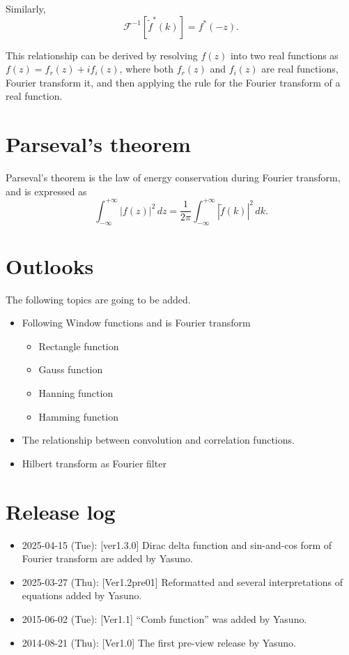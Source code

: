 \documentclass[a4paper]{article}
\newcommand{\intinfty}{\int^{+\infty}_{-\infty}\xspace}
\newcommand{\abs}[1]{\left|{#1}\right|\xspace}
\newcommand{\iftf}[1]{{\mathcal{F}^{-1}\left[#1\right]\xspace}}
\newcommand{\ftt}[1]{{\tilde{#1}\xspace}}
\begin{document}
Similarly,
\begin{equation}
	\iftf{\ftt{f}^*(k)} = f^*(-z).
\end{equation}

This relationship can be derived by resolving $f(z)$ into two real functions as $f(z) = f_r(z) + i f_i(z)$, where both $f_r(z)$ and $f_i(z)$ are real functions, Fourier transform it, and then applying the rule for the Fourier transform of a real function.

\section{Parseval’s theorem}
Parseval’s theorem is the law of energy conservation during Fourier transform, and is expressed as 
\begin{equation}
	\intinfty \abs{f(z)}^2 \, dz
	= \frac{1}{2\pi} \intinfty \abs{\ftt{f}(k)}^2  \, dk.
\end{equation}

\section*{Outlooks}
The following topics are going to be added.
\begin{itemize}
	\item Following Window functions and is Fourier transform
	\begin{itemize}
		\item Rectangle function
		\item Gauss function
		\item Hanning function
		\item Hamming function
	\end{itemize}
	\item The relationship between convolution and correlation functions.
	\item Hilbert transform as Fourier filter
\end{itemize}

\section*{Release log}
\begin{itemize}
\item 2025-04-15 (Tue): [ver1.3.0] Dirac delta function and sin-and-cos form of Fourier transform are added by Yasuno.
\item 2025-03-27 (Thu): [Ver1.2pre01] Reformatted and several interpretations of equations added by Yasuno.
\item 2015-06-02 (Tue): [Ver1.1] ``Comb function'' was added by Yasuno.	
\item 2014-08-21 (Thu): [Ver1.0] The first pre-view release by Yasuno.
\end{itemize}
\end{document}
